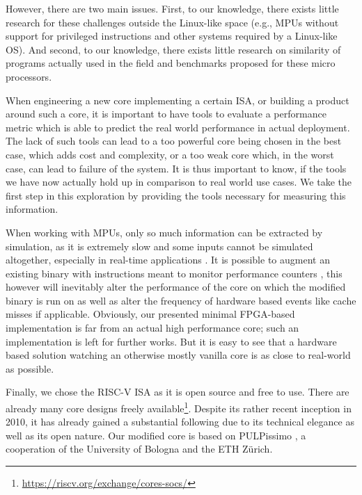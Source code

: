 \documentclass[../bachelor_paper.tex]{subfiles}
\begin{document}
However, there are two main issues. First, to our knowledge, there exists little research for these challenges outside the Linux-like space (e.g., \ac{MPU}s without support for privileged instructions and other systems required by a Linux-like \ac{OS}). And second, to our knowledge, there exists little research on similarity of programs actually used in the field and benchmarks proposed for these micro processors.

When engineering a new core implementing a certain \ac{ISA}, or building a product around such a core, it is important to have tools to evaluate a performance metric which is able to predict the real world performance in actual deployment. The lack of such tools can lead to a too powerful core being chosen in the best case, which adds cost and complexity, or a too weak core which, in the worst case, can lead to failure of the system. It is thus important to know, if the tools we have now actually hold up in comparison to real world use cases. We take the first step in this exploration by providing the tools necessary for measuring this information.

When working with \ac{MPU}s, only so much information can be extracted by simulation, as it is extremely slow \cite{eeckhoutDesigningComputerArchitecture2003,kaoHardwareApproachRealTime2007} and some inputs cannot be simulated altogether, especially in real-time applications \cite{kaoHardwareApproachRealTime2007}. It is possible to augment an existing binary with instructions meant to monitor performance counters \cite{eeckhoutQuantifyingImpactInput}, this however will inevitably alter the performance of the core on which the modified binary is run on as well as alter the frequency of hardware based events like cache misses if applicable. Obviously, our presented minimal FPGA-based implementation is far from an actual high performance core; such an implementation is left for further works. But it is easy to see that a hardware based solution watching an otherwise mostly vanilla core is as close to real-world as possible.

Finally, we chose the RISC-V ISA \cite{RISCVTechnicalSpecification} as it is open source and free to use. There are already many core designs freely available\footnote{\url{https://riscv.org/exchange/cores-socs/}}. Despite its rather recent inception in 2010, it has already gained a substantial following due to its technical elegance as well as its open nature. Our modified core is based on PULPissimo \cite{PulpplatformPulpissimo2021}, a cooperation of the University of Bologna and the ETH Z\"urich.
\end{document}
